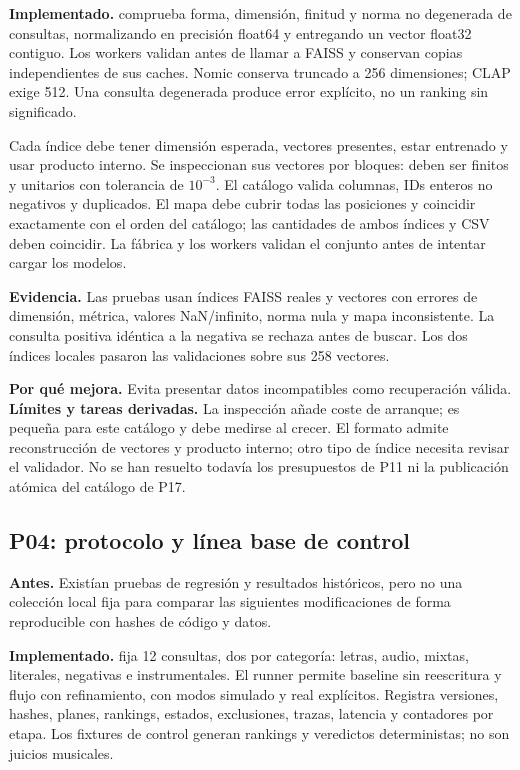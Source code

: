 \textbf{Implementado.}  comprueba forma, dimensión,
finitud y norma no degenerada de consultas, normalizando en precisión float64
y entregando un vector float32 contiguo. Los workers validan antes de llamar a
FAISS y conservan copias independientes de sus caches. Nomic conserva truncado
a 256 dimensiones; CLAP exige 512. Una consulta degenerada produce error
explícito, no un ranking sin significado.

Cada índice debe tener dimensión esperada, vectores presentes, estar entrenado
y usar producto interno. Se inspeccionan sus vectores por bloques: deben ser
finitos y unitarios con tolerancia de $10^{-3}$. El catálogo valida columnas,
IDs enteros no negativos y duplicados. El mapa debe cubrir todas las posiciones
y coincidir exactamente con el orden del catálogo; las cantidades de ambos
índices y CSV deben coincidir. La fábrica y los workers validan el conjunto
antes de intentar cargar los modelos.

\textbf{Evidencia.} Las pruebas usan índices FAISS reales y vectores con errores
de dimensión, métrica, valores NaN/infinito, norma nula y mapa inconsistente.
La consulta positiva idéntica a la negativa se rechaza antes de buscar.
Los dos índices locales pasaron las validaciones sobre sus 258 vectores.

\textbf{Por qué mejora.} Evita presentar datos incompatibles como recuperación
válida. \textbf{Límites y tareas derivadas.} La inspección añade coste de arranque;
es pequeña para este catálogo y debe medirse al crecer. El formato admite
reconstrucción de vectores y producto interno; otro tipo de índice necesita
revisar el validador. No se han resuelto todavía los presupuestos de P11 ni
la publicación atómica del catálogo de P17.

\subsection{P04: protocolo y línea base de control}
\textbf{Antes.} Existían pruebas de regresión y resultados históricos, pero no
una colección local fija para comparar las siguientes modificaciones de forma
reproducible con hashes de código y datos.

\textbf{Implementado.}  fija 12 consultas, dos por
categoría: letras, audio, mixtas, literales, negativas e instrumentales.
El runner permite baseline sin reescritura y flujo con refinamiento, con modos
simulado y real explícitos. Registra versiones, hashes, planes, rankings,
estados, exclusiones, trazas, latencia y contadores por etapa. Los fixtures
de control generan rankings y veredictos deterministas; no son juicios musicales.

